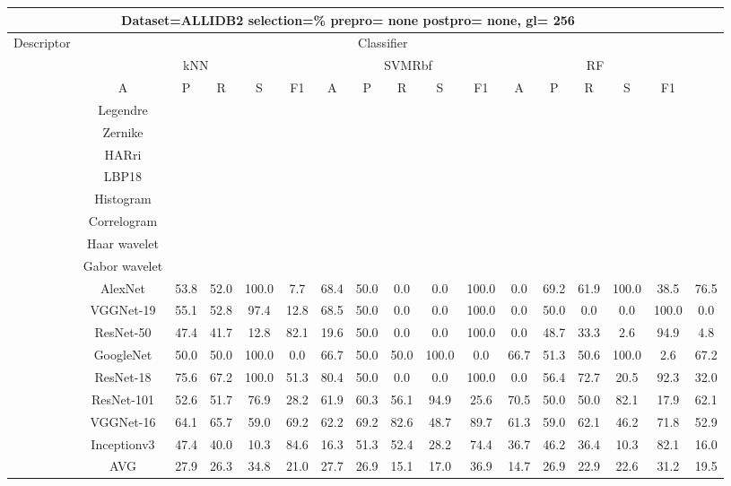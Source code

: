 \documentclass[12pt,italian]{article}
\begin{document}
\begin{tiny}
 \pagebreak 
\begin{longtable}{lcccccccccccccccc}
\toprule
\multicolumn{16}{c}{Dataset=ALLIDB2 selection=\% prepro= none postpro= none, gl= 256} \\ 
\toprule
Descriptor & \multicolumn{15}{c}{Classifier} \\ 
& \multicolumn{5}{c}{kNN} & \multicolumn{5}{c}{SVMRbf} & \multicolumn{5}{c}{RF} \\ 
& A & P & R & S & F1 & A & P & R & S & F1 & A & P & R & S & F1 \\ 
\midrule
& Legendre \\ 
& Zernike \\ 
& HARri \\ 
& LBP18 \\ 
& Histogram \\ 
& Correlogram \\ 
& Haar wavelet \\ 
& Gabor wavelet \\ 
& AlexNet & 53.8 & 52.0 & 100.0 &  7.7 & 68.4 & 50.0 &  0.0 &  0.0 & 100.0 &  0.0 & 69.2 & 61.9 & 100.0 & 38.5 & 76.5 \\ 
& VGGNet-19 & 55.1 & 52.8 & 97.4 & 12.8 & 68.5 & 50.0 &  0.0 &  0.0 & 100.0 &  0.0 & 50.0 &  0.0 &  0.0 & 100.0 &  0.0 \\ 
& ResNet-50 & 47.4 & 41.7 & 12.8 & 82.1 & 19.6 & 50.0 &  0.0 &  0.0 & 100.0 &  0.0 & 48.7 & 33.3 &  2.6 & 94.9 &  4.8 \\ 
& GoogleNet & 50.0 & 50.0 & 100.0 &  0.0 & 66.7 & 50.0 & 50.0 & 100.0 &  0.0 & 66.7 & 51.3 & 50.6 & 100.0 &  2.6 & 67.2 \\ 
& ResNet-18 & 75.6 & 67.2 & 100.0 & 51.3 & 80.4 & 50.0 &  0.0 &  0.0 & 100.0 &  0.0 & 56.4 & 72.7 & 20.5 & 92.3 & 32.0 \\ 
& ResNet-101 & 52.6 & 51.7 & 76.9 & 28.2 & 61.9 & 60.3 & 56.1 & 94.9 & 25.6 & 70.5 & 50.0 & 50.0 & 82.1 & 17.9 & 62.1 \\ 
& VGGNet-16 & 64.1 & 65.7 & 59.0 & 69.2 & 62.2 & 69.2 & 82.6 & 48.7 & 89.7 & 61.3 & 59.0 & 62.1 & 46.2 & 71.8 & 52.9 \\ 
& Inceptionv3 & 47.4 & 40.0 & 10.3 & 84.6 & 16.3 & 51.3 & 52.4 & 28.2 & 74.4 & 36.7 & 46.2 & 36.4 & 10.3 & 82.1 & 16.0 \\ 
\hline
& AVG & 27.9 & 26.3 & 34.8 & 21.0 & 27.7 & 26.9 & 15.1 & 17.0 & 36.9 & 14.7 & 26.9 & 22.9 & 22.6 & 31.2 & 19.5 \\ 
\hline
\bottomrule
\end{longtable} 

 \pagebreak 
\end{tiny} 
 
\end{document}
